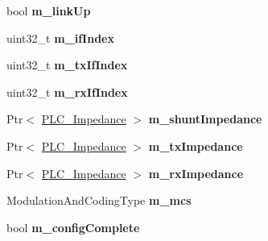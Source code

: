 \begin{DoxyCompactItemize}
\item 
\hypertarget{classns3_1_1PLC__NetDevice_add8c8bcfc2470e991bcc72e0062b75fd}{bool {\bfseries m\-\_\-link\-Up}}\label{classns3_1_1PLC__NetDevice_add8c8bcfc2470e991bcc72e0062b75fd}

\item 
\hypertarget{classns3_1_1PLC__NetDevice_ae54c6abd79f1ee7d01a398b40c67c166}{uint32\-\_\-t {\bfseries m\-\_\-if\-Index}}\label{classns3_1_1PLC__NetDevice_ae54c6abd79f1ee7d01a398b40c67c166}

\item 
\hypertarget{classns3_1_1PLC__NetDevice_a79795d35166a47eb3cfb66ef4e3fb23d}{uint32\-\_\-t {\bfseries m\-\_\-tx\-If\-Index}}\label{classns3_1_1PLC__NetDevice_a79795d35166a47eb3cfb66ef4e3fb23d}

\item 
\hypertarget{classns3_1_1PLC__NetDevice_ac672e6c848c42b442a1305ce81d97b22}{uint32\-\_\-t {\bfseries m\-\_\-rx\-If\-Index}}\label{classns3_1_1PLC__NetDevice_ac672e6c848c42b442a1305ce81d97b22}

\item 
\hypertarget{classns3_1_1PLC__NetDevice_a13a830a72f54029a291a878d2c6e5b17}{\-Ptr$<$ \hyperlink{classns3_1_1PLC__ValueBase}{\-P\-L\-C\-\_\-\-Impedance} $>$ {\bfseries m\-\_\-shunt\-Impedance}}\label{classns3_1_1PLC__NetDevice_a13a830a72f54029a291a878d2c6e5b17}

\item 
\hypertarget{classns3_1_1PLC__NetDevice_a5f5940db4b3fb53bea1b789915ab467e}{\-Ptr$<$ \hyperlink{classns3_1_1PLC__ValueBase}{\-P\-L\-C\-\_\-\-Impedance} $>$ {\bfseries m\-\_\-tx\-Impedance}}\label{classns3_1_1PLC__NetDevice_a5f5940db4b3fb53bea1b789915ab467e}

\item 
\hypertarget{classns3_1_1PLC__NetDevice_a6426a2401946a2f7d89701c9f34f4266}{\-Ptr$<$ \hyperlink{classns3_1_1PLC__ValueBase}{\-P\-L\-C\-\_\-\-Impedance} $>$ {\bfseries m\-\_\-rx\-Impedance}}\label{classns3_1_1PLC__NetDevice_a6426a2401946a2f7d89701c9f34f4266}

\item 
\hypertarget{classns3_1_1PLC__NetDevice_afcfc1d9a7624cba1c310701e03ff3f8c}{\-Modulation\-And\-Coding\-Type {\bfseries m\-\_\-mcs}}\label{classns3_1_1PLC__NetDevice_afcfc1d9a7624cba1c310701e03ff3f8c}

\item 
\hypertarget{classns3_1_1PLC__NetDevice_aee77958923cbffff0b36eabbd7d2070c}{bool {\bfseries m\-\_\-config\-Complete}}\label{classns3_1_1PLC__NetDevice_aee77958923cbffff0b36eabbd7d2070c}


\end{DoxyCompactItemize}
